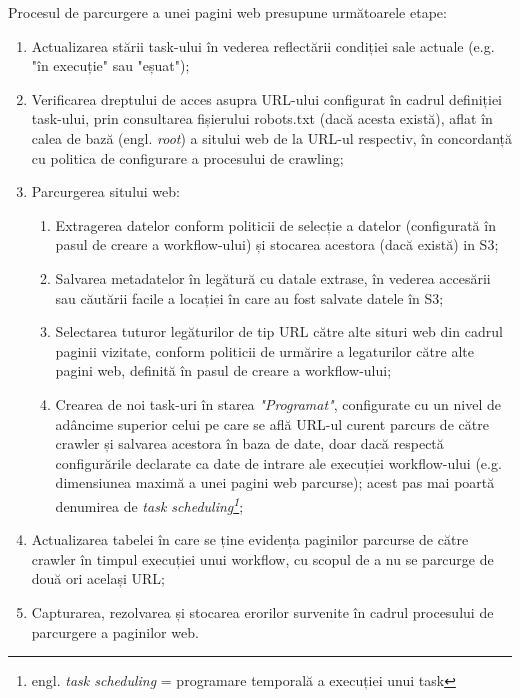 \noindent
Procesul de parcurgere a unei pagini web presupune următoarele etape:

\begin{enumerate}
	\item{Actualizarea stării task-ului în vederea reflectării condiției sale actuale (e.g. "în execuție" sau "eșuat");}
	
	\item{Verificarea dreptului de acces asupra URL-ului configurat în cadrul definiției task-ului, prin consultarea fișierului robots.txt (dacă acesta există), aflat în calea de bază (engl. \textit{root}) a sitului web de la URL-ul respectiv, în concordanță cu politica de configurare a procesului de crawling;}
	
	\item{Parcurgerea sitului web:}
	\begin{enumerate}
		\item{Extragerea datelor conform politicii de selecție a datelor (configurată în pasul de creare a workflow-ului) și stocarea acestora (dacă există) in S3;}
		
		\item{Salvarea metadatelor în legătură cu datale extrase, în vederea accesării sau căutării facile a locației în care au fost salvate datele în S3;}
		
		\item{Selectarea tuturor legăturilor de tip URL către alte situri web din cadrul paginii vizitate, conform politicii de urmărire a legaturilor către alte pagini web, definită în pasul de creare a workflow-ului;}
		
		\item{Crearea de noi task-uri în starea \textit{"Programat"}, configurate cu un nivel de adâncime superior celui pe care se află URL-ul curent parcurs de către crawler și salvarea acestora în baza de date, doar dacă respectă configurările declarate ca date de intrare ale execuției workflow-ului (e.g. dimensiunea maximă a unei pagini web parcurse); acest pas mai poartă denumirea de \textit{task scheduling\footnote{engl. \textit{task scheduling} = programare temporală a execuției unui task}};}
		
	\end{enumerate}
	
	\item{Actualizarea tabelei în care se ține evidența paginilor parcurse de către crawler în timpul execuției unui workflow, cu scopul de a nu se parcurge de două ori același URL;}
		
	\item{Capturarea, rezolvarea și stocarea erorilor survenite în cadrul procesului de parcurgere a paginilor web.}
	
\end{enumerate}

